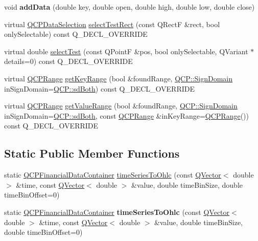\begin{DoxyCompactItemize}
\item 
\mbox{\label{class_q_c_p_financial_a688bbd052e00a02954ddb0068b378170}} 
void {\bfseries add\+Data} (double key, double open, double high, double low, double close)
\item 
virtual \hyperlink{class_q_c_p_data_selection}{Q\+C\+P\+Data\+Selection} \hyperlink{class_q_c_p_financial_a2d7c9beec376fed78a6091a17f59eb1e}{select\+Test\+Rect} (const Q\+RectF \&rect, bool only\+Selectable) const Q\+\_\+\+D\+E\+C\+L\+\_\+\+O\+V\+E\+R\+R\+I\+DE
\item 
virtual double \hyperlink{class_q_c_p_financial_a6067c625621b07a85a6989a0a4b8d309}{select\+Test} (const Q\+PointF \&pos, bool only\+Selectable, Q\+Variant $\ast$details=0) const Q\+\_\+\+D\+E\+C\+L\+\_\+\+O\+V\+E\+R\+R\+I\+DE
\item 
virtual \hyperlink{class_q_c_p_range}{Q\+C\+P\+Range} \hyperlink{class_q_c_p_financial_abb56add5757f53239d8bef462bd53578}{get\+Key\+Range} (bool \&found\+Range, \hyperlink{namespace_q_c_p_afd50e7cf431af385614987d8553ff8a9}{Q\+C\+P\+::\+Sign\+Domain} in\+Sign\+Domain=\hyperlink{namespace_q_c_p_afd50e7cf431af385614987d8553ff8a9a3dee7e9cd2fedce9253b83e172626a6c}{Q\+C\+P\+::sd\+Both}) const Q\+\_\+\+D\+E\+C\+L\+\_\+\+O\+V\+E\+R\+R\+I\+DE
\item 
virtual \hyperlink{class_q_c_p_range}{Q\+C\+P\+Range} \hyperlink{class_q_c_p_financial_ac3ce2b2c76c755078f9a0a4c84802de6}{get\+Value\+Range} (bool \&found\+Range, \hyperlink{namespace_q_c_p_afd50e7cf431af385614987d8553ff8a9}{Q\+C\+P\+::\+Sign\+Domain} in\+Sign\+Domain=\hyperlink{namespace_q_c_p_afd50e7cf431af385614987d8553ff8a9a3dee7e9cd2fedce9253b83e172626a6c}{Q\+C\+P\+::sd\+Both}, const \hyperlink{class_q_c_p_range}{Q\+C\+P\+Range} \&in\+Key\+Range=\hyperlink{class_q_c_p_range}{Q\+C\+P\+Range}()) const Q\+\_\+\+D\+E\+C\+L\+\_\+\+O\+V\+E\+R\+R\+I\+DE
\end{DoxyCompactItemize}
\subsection*{Static Public Member Functions}
\begin{DoxyCompactItemize}
\item 
static \hyperlink{class_q_c_p_data_container}{Q\+C\+P\+Financial\+Data\+Container} \hyperlink{class_q_c_p_financial_a9a058c035040d3939b8884f4aaccb1a7}{time\+Series\+To\+Ohlc} (const \hyperlink{class_q_vector}{Q\+Vector}$<$ double $>$ \&time, const \hyperlink{class_q_vector}{Q\+Vector}$<$ double $>$ \&value, double time\+Bin\+Size, double time\+Bin\+Offset=0)
\item 
\mbox{\label{class_q_c_p_financial_a65dd164f9c4dc7b031c39128b06e9279}} 
static \hyperlink{class_q_c_p_data_container}{Q\+C\+P\+Financial\+Data\+Container} {\bfseries time\+Series\+To\+Ohlc} (const \hyperlink{class_q_vector}{Q\+Vector}$<$ double $>$ \&time, const \hyperlink{class_q_vector}{Q\+Vector}$<$ double $>$ \&value, double time\+Bin\+Size, double time\+Bin\+Offset=0)
\end{DoxyCompactItemize}
